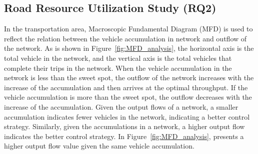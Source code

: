 \subsection{Road Resource Utilization Study (RQ2)}
In the transportation area, Macroscopic Fundamental Diagram (MFD) is used to reflect the relation between the vehicle accumulation in network and outflow of the network. As is shown in Figure~\ref{fig:MFD_analysis}, the horizontal axis is the total vehicle in the network, and the vertical axis is the total vehicles that complete their trips in the network. When the vehicle accumulation in the network is less than the sweet spot, the outflow of the network increases with the increase of the accumulation and then arrives at the
optimal throughput. If the vehicle accumulation is more than the sweet spot, the outflow decreases with the increase of the accumulation. Given the output flows of a network, a smaller accumulation indicates fewer vehicles in the network, indicating a better control strategy. Similarly, given the accumulations in a network, a higher output flow indicates the better control strategy. In Figure~\ref{fig:MFD_analysis},  \PressLight presents a higher output flow value given the same vehicle accumulation.





